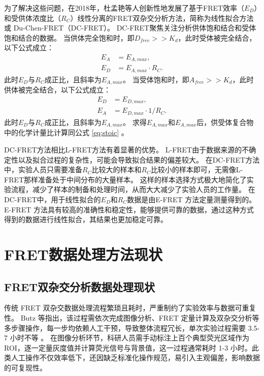 为了解决这些问题，在2018年，杜孟艳等人创新性地发展了基于FRET效率（$E_D$）和受供体浓度比（$R_C$）线性分离的FRET双杂交分析方法，简称为线性拟合方法或 Du-Chen-FRET（DC-FRET）。
DC-FRET聚焦关注分析供体饱和结合和受体饱和结合的数据。
当供体完全饱和时，即$D_{free}>>K_d$，此时受体被完全结合，以下公式成立：
\begin{align} 
    E_A &= E_{A,max}, \label{eq:ea_appro} \\
    E_D &= {E_{A,max}}{\cdot}{R_C}. \label{eq:ea_slope}
\end{align}
此时$E_D$与$R_C$成正比，且斜率为$E_{A,max}$。
当受体饱和时，即$A_{free}>>K_d$，此时供体被完全结合，以下公式成立：
\begin{align}
    E_D &= E_{D,max}, \label{eq:ed_appro} \\
    E_A &= E_{D,max}{\cdot}{1/R_C}. \label{eq:ed_slope}
\end{align}
此时$E_D$与$R_C$成正比，且斜率为$E_{A,max}$。
求得$E_{A,max}$和$E_{A,max}$后，供受体复合物中的化学计量比计算同公式 \ref{eq:stoic} 。

DC-FRET方法相比L-FRET方法有着显著的优势。
L-FRET由于数据来源的不确定性以及拟合过程的复杂性，可能会导致拟合结果的偏差较大。
在DC-FRET方法中，实验人员只需要准备$R_C$比较大的样本和$R_C$比较小的样本即可，无需像L-FRET那样准备处于中间分布的大量样本。
这样的样本选择方式极大地简化了实验流程，减少了样本的制备和处理时间，从而大大减少了实验人员的工作量。
在DC-FRET中，用于线性拟合的$E_D$和$R_C$数据是由E-FRET 方法定量测量得到的。E-FRET 方法具有较高的准确性和稳定性，能够提供可靠的数据，通过这种方式得到的数据进行线性拟合，其结果也更加稳定可靠。
\fi

\section{FRET数据处理方法现状}

\subsection{FRET双杂交分析数据处理现状}

\ifshowtext
传统 FRET 双杂交数据处理流程繁琐且耗时，严重制约了实验效率与数据可重复性。
Butz 等指出，该过程需依次完成图像分析、FRET 定量计算及双杂交分析等多步骤操作，每一步均依赖人工干预，导致整体流程冗长，单次实验过程需要 3.5-7 小时不等 。
在图像分析环节，科研人员需手动标注上百个典型荧光区域作为 ROI，逐一定量灰度值并计算荧光信号与背景值，这一过程通常耗时 1-3 小时。此类人工操作不仅效率低下，还因缺乏标准化操作规范，易引入主观偏差，影响数据的可复现性。

